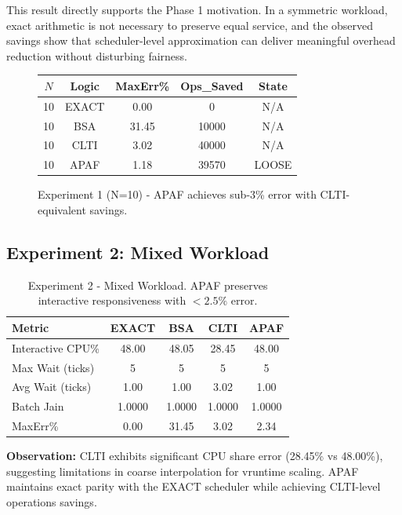 \documentclass[conference]{IEEEtran}
\begin{document}
This result directly supports the Phase 1 motivation. In a symmetric workload, exact arithmetic is not necessary to preserve equal service, and the observed savings show that scheduler-level approximation can deliver meaningful overhead reduction without disturbing fairness.

\begin{figure}[h]
\centering
\begin{tabular}{|c|c|c|c|c|}
\hline
$N$ & Logic & MaxErr\% & Ops\_Saved & State \\
\hline
10 & EXACT & 0.00 & 0 & N/A \\
10 & BSA & 31.45 & 10000 & N/A \\
10 & CLTI & 3.02 & 40000 & N/A \\
10 & APAF & 1.18 & 39570 & LOOSE \\
\hline
\end{tabular}
\caption{Experiment 1 (N=10) - APAF achieves sub-3\% error with CLTI-equivalent savings.}
\label{fig:exp1_table}
\end{figure}

\subsection{Experiment 2: Mixed Workload}

\begin{table}[h]
\centering
\begin{tabular}{|l|c|c|c|c|}
\hline
\textbf{Metric} & \textbf{EXACT} & \textbf{BSA} & \textbf{CLTI} & \textbf{APAF} \\
\hline
Interactive CPU\% & 48.00 & 48.05 & 28.45 & 48.00 \\
Max Wait (ticks) & 5 & 5 & 5 & 5 \\
Avg Wait (ticks) & 1.00 & 1.00 & 3.02 & 1.00 \\
Batch Jain & 1.0000 & 1.0000 & 1.0000 & 1.0000 \\
MaxErr\% & 0.00 & 31.45 & 3.02 & 2.34 \\
\hline
\end{tabular}
\label{tab:exp2}
\caption{Experiment 2 - Mixed Workload. APAF preserves interactive responsiveness with $<2.5\%$ error.}
\end{table}

\textbf{Observation:} CLTI exhibits significant CPU share error (28.45\% vs 48.00\%), suggesting limitations in coarse interpolation for vruntime scaling. APAF maintains exact parity with the EXACT scheduler while achieving CLTI-level operations savings.
\end{document}
